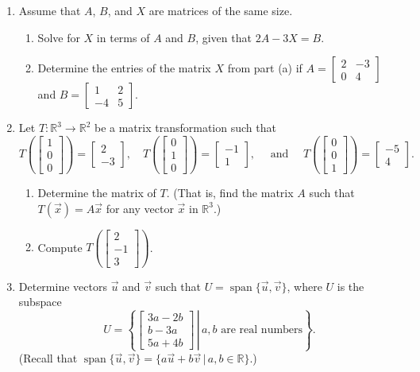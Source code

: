 \documentclass[12pt]{article}
\newcommand{\points}[1]{\marginpar{\hspace{24pt}[#1]}}
\newcommand{\R}{\mathbb{R}}
\newcommand{\bbm}{\begin{bmatrix}}
\newcommand{\ebm}{\end{bmatrix}}
\begin{document}
\begin{enumerate}
\item Assume that $A$, $B$, and $X$ are matrices of the same size.
\begin{enumerate}
 \item Solve for $X$ in terms of $A$ and $B$, given that $2A-3X=B$.\points{3}

\vspace{1in}

 \item Determine the entries of the matrix $X$ from part (a) if $A=\bbm 2&-3\\0&4\ebm$ and $B=\bbm 1&2\\-4&5\ebm$.\points{3}
\end{enumerate}

\vspace{2in}

\item Let $T:\R^3\to \R^2$ be a matrix transformation such that
\[
 T\left(\bbm 1\\0\\0\ebm\right) = \bbm 2\\-3\ebm,\quad T\left(\bbm 0\\1\\0\ebm\right) = \bbm -1\\1\ebm, \quad \text{ and } \quad T\left(\bbm 0\\0\\1\ebm\right) = \bbm -5\\4\ebm.
\]
\begin{enumerate}
 \item Determine the matrix of $T$. (That is, find the matrix $A$ such that $T(\vec{x})=A\vec{x}$ for any vector $\vec{x}$ in $\R^3$.) \points{3}

\vspace{1.25in}

 \item Compute $T\left(\bbm 2\\-1\\3\ebm\right)$. \points{3}
\end{enumerate}

\newpage

\item Determine vectors $\vec{u}$ and $\vec{v}$ such that $U=\operatorname{span}\{\vec{u},\vec{v}\}$, where $U$ is the subspace \points{4}
\[
 U = \left\{\left.\bbm 3a-2b\\b-3a\\5a+4b\ebm \,\right|\, a,b \text{ are real numbers}\right\}.
\]
(Recall that $\operatorname{span}\{\vec{u},\vec{v}\} = \{a\vec{u}+b\vec{v}\,|\, a,b\in\R\}$.)


\end{enumerate}
\end{document}
